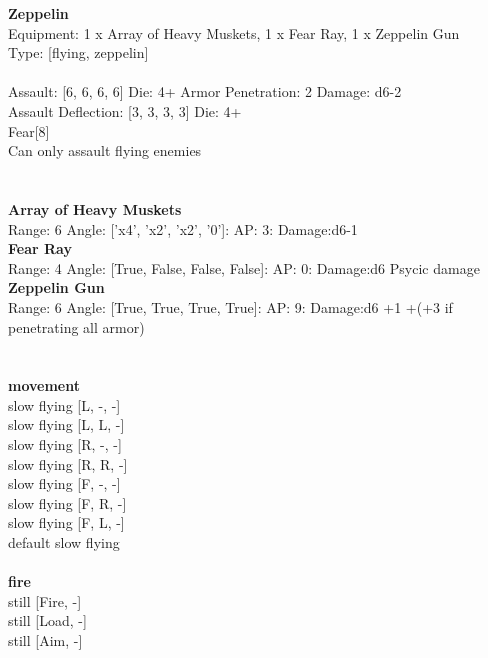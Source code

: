 {\bf Zeppelin } \\
Equipment: 1 x Array of Heavy Muskets, 1 x Fear Ray, 1 x Zeppelin Gun \\
Type: [flying, zeppelin] \\
\ \\
Assault: [6, 6, 6, 6] Die: 4+ Armor Penetration: 2 Damage: d6-2 \\
Assault Deflection: [3, 3, 3, 3] Die: 4+\\
\indent Fear[8]\\ 
Can only assault flying enemies\\ 
 
\ \\

\ \\
{\bf Array of Heavy Muskets } \\



Range: 6  Angle: ['x4', 'x2', 'x2', '0']: AP: 3: Damage:d6-1 \\




{\bf Fear Ray } \\



Range: 4  Angle: [True, False, False, False]: AP: 0: Damage:d6 Psycic damage \\




{\bf Zeppelin Gun } \\



Range: 6  Angle: [True, True, True, True]: AP: 9: Damage:d6 +1 +(+3 if penetrating all armor) \\




 
\ \\




\ \\ {\bf movement } \\
slow flying [L, -, -] \\
slow flying [L, L, -] \\
slow flying [R, -, -] \\
slow flying [R, R, -] \\
slow flying [F, -, -] \\
slow flying [F, R, -] \\
slow flying [F, L, -] \\
default slow flying \\
\ \\ {\bf fire } \\
still [Fire, -] \\
still [Load, -] \\
still [Aim, -] \\


